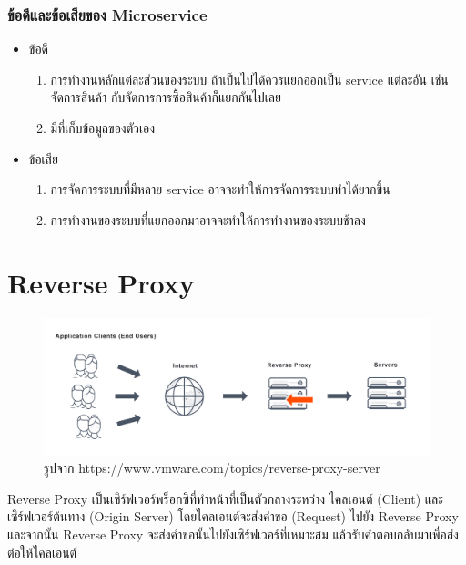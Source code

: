 \subsubsection{ข้อดีและข้อเสียของ Microservice}
\begin{itemize}
  \item ข้อดี
  \begin{enumerate}
    \item การทำงานหลักแต่ละส่วนของระบบ ถ้าเป็นไปได้ควรแยกออกเป็น service แต่ละอัน เช่นจัดการสินค้า กับจัดการการซื้อสินค้าก็แยกกันไปเลย
    \item มีที่เก็บข้อมูลของตัวเอง
  \end{enumerate}
  \item ข้อเสีย
  \begin{enumerate}
    \item การจัดการระบบที่มีหลาย service อาจจะทำให้การจัดการระบบทำได้ยากขึ้น
    \item การทำงานของระบบที่แยกออกมาอาจจะทำให้การทำงานของระบบช้าลง
  \end{enumerate}
\end{itemize}
\clearpage

\section{Reverse Proxy}
\begin{figure}[H]
  \centering
  \includegraphics[width=\linewidth, keepaspectratio]{pictures/reverse_proxy.png}
  \caption[Reverse Proxy]{รูปจาก https://www.vmware.com/topics/reverse-proxy-server}
  \label{fig:reverse-proxy}
\end{figure}

\hspace{1.27cm}Reverse Proxy\cite{ReverseProxy} เป็นเซิร์ฟเวอร์พร็อกซีที่ทำหน้าที่เป็นตัวกลางระหว่าง ไคลเอนต์ (Client) และ เซิร์ฟเวอร์ต้นทาง (Origin Server) โดยไคลเอนต์จะส่งคำขอ (Request) ไปยัง Reverse Proxy และจากนั้น Reverse Proxy จะส่งคำขอนั้นไปยังเซิร์ฟเวอร์ที่เหมาะสม แล้วรับคำตอบกลับมาเพื่อส่งต่อให้ไคลเอนต์

